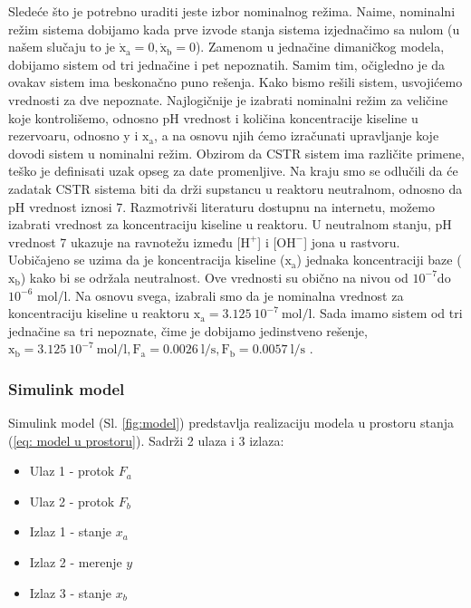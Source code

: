 \documentclass[a4paper,11pt]{article}
\theoremstyle{definition} \newtheorem{deff}{Definicija}[section]
\theoremstyle{definition} \newtheorem{prim}[deff]{Primer}
\theoremstyle{plain} \newtheorem{teor}[deff]{Teorema}
\begin{document}
	
	Sledeće što je potrebno uraditi jeste izbor nominalnog režima. Naime, nominalni režim sistema dobijamo kada prve izvode stanja sistema izjednačimo sa nulom (u našem slučaju to je $\mathrm{\dot{x}_a = 0, \dot{x}_b = 0 }$). Zamenom u jednačine dimaničkog modela, dobijamo sistem od tri jednačine i pet nepoznatih. Samim tim, očigledno je da ovakav sistem ima beskonačno puno rešenja. Kako bismo rešili sistem, usvojićemo vrednosti za dve nepoznate. Najlogičnije je izabrati nominalni režim za veličine koje kontrolišemo, odnosno pH vrednost i količina koncentracije kiseline u rezervoaru, odnosno y i $\mathrm{x_a}$, a na osnovu njih ćemo izračunati upravljanje koje dovodi sistem u nominalni režim. Obzirom da CSTR sistem ima različite primene, teško je definisati uzak opseg za date promenljive. Na kraju smo se odlučili da će zadatak CSTR sistema biti da drži supstancu u reaktoru neutralnom, odnosno da pH vrednost iznosi 7. Razmotrivši literaturu dostupnu na internetu, možemo izabrati vrednost za koncentraciju kiseline u reaktoru. U neutralnom stanju, pH vrednost 7 ukazuje na ravnotežu između [$\text{H}^+$] i [$\text{OH}^-$] jona u rastvoru. Uobičajeno se uzima da je koncentracija kiseline ($\mathrm{x_a}$) jednaka koncentraciji baze ($\mathrm{x_b}$) kako bi se održala neutralnost. Ove vrednosti su obično na nivou od $\mathrm{10^{-7}}$do $\mathrm{10^{-6}}$ mol/l. Na osnovu svega, izabrali smo da je nominalna vrednost za koncentraciju kiseline u reaktoru $\mathrm{x_a = 3.125~10^{-7} \: mol/l }$. Sada imamo sistem od tri jednačine sa tri nepoznate, čime je dobijamo jedinstveno rešenje, $\mathrm{x_b = 3.125~10^{-7} \: mol/l}, \mathrm{F_a = 0.0026 \: l/s}, \mathrm{F_b = 0.0057 \: l/s }$ .\\
	\clearpage
	
	
	
	\subsubsection{Simulink model}
	
	Simulink model (Sl. \ref{fig:model}) predstavlja realizaciju modela u prostoru stanja (\ref{eq: model u prostoru}). Sadrži 2 ulaza i 3 izlaza:
	\begin{itemize}
		\item Ulaz 1 - protok $F_a$
		\item Ulaz 2 - protok $F_b$
		\item Izlaz 1 - stanje $x_a$
		\item Izlaz 2 - merenje $y$
		\item Izlaz 3 - stanje $x_b$
	\end{itemize}
	\vspace{2cm}
	
\end{document}
